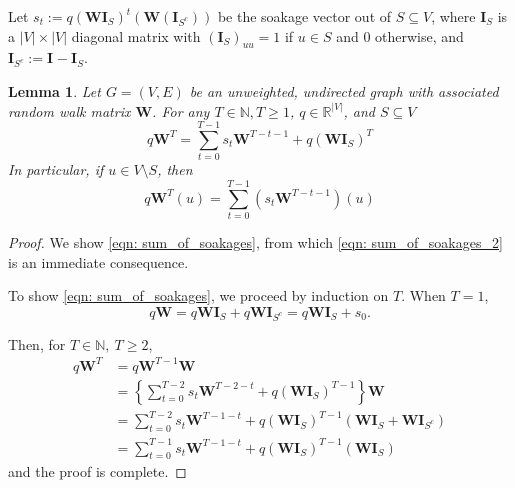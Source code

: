 \documentclass{article}
\newcommand{\abs}[1]{\left \lvert #1 \right \rvert}
\newcommand{\Reals}{\mathbb{R}}
\newcommand{\1}{\mathbf{1}}
\newcommand{\Wbf}{\mathbf{W}}
\newcommand{\Ibf}[1]{\mathbf{I}_{#1}}
\theoremstyle{aldenthm}
\newtheorem{lemma}{Lemma}
\begin{document}
Let $s_t := q(\Wbf \Ibf{S})^t(\Wbf(\Ibf{S^c}))$ be the soakage vector out of $S \subseteq V$, where $\Ibf{S}$ is a $\abs{V} \times \abs{V}$ diagonal matrix with $(\Ibf{S})_{uu} = 1$ if $u \in S$ and 0 otherwise, and $\Ibf{S^c} := \Ibf{} - \Ibf{S}$. 
\begin{lemma}
	\label{lem: sum_of_soakages}
	Let $G = (V,E)$ be an unweighted, undirected graph with associated random walk matrix $\Wbf$. For any $T \in \mathbb{N}, T \geq 1$, $q \in \Reals^{\abs{V}}$, and $S \subseteq V$
	\begin{equation}
	\label{eqn: sum_of_soakages}
	q\Wbf^T = \sum_{t = 0}^{T - 1} s_t \Wbf^{T - t - 1} + q(\Wbf \Ibf{S})^T
	\end{equation}
	In particular, if $u \in V\setminus S$, then
	\begin{equation}
	\label{eqn: sum_of_soakages_2}
	q\Wbf^T(u) = \sum_{t = 0}^{T - 1} \left(s_t \Wbf^{T - t - 1}\right)(u)
	\end{equation}
\end{lemma}
\begin{proof}	
	We show \eqref{eqn: sum_of_soakages}, from which \eqref{eqn: sum_of_soakages_2} is an immediate consequence.
	
	
	To show \eqref{eqn: sum_of_soakages}, we proceed by induction on $T$. When $T = 1$,
	\begin{equation*}
	q\Wbf = q\Wbf\Ibf{S} + q\Wbf\Ibf{S^c} =  q\Wbf\Ibf{S} + s_0. 
	\end{equation*}
	
	Then, for $T \in \mathbb{N},~ T \geq 2$,
	\begin{align*}
	q\Wbf^{T} & = q\Wbf^{T - 1}{\Wbf} \\
	& = \left\{\sum_{t = 0}^{T - 2} s_t \Wbf^{T - 2 - t} + q(\Wbf \Ibf{S})^{T - 1} \right\} \Wbf \tag{by the inductive hypothesis}\\
	& = \sum_{t = 0}^{T - 2} s_t \Wbf^{T - 1 - t} + q(\Wbf \Ibf{S})^{T - 1} (\Wbf \Ibf{S} + \Wbf \Ibf{S^c}) \\
	& = \sum_{t = 0}^{T - 1} s_t \Wbf^{T - 1 - t} + q(\Wbf \Ibf{S})^{T - 1} (\Wbf \Ibf{S})
	\end{align*}
	and the proof is complete.
\end{proof}
\end{document}
